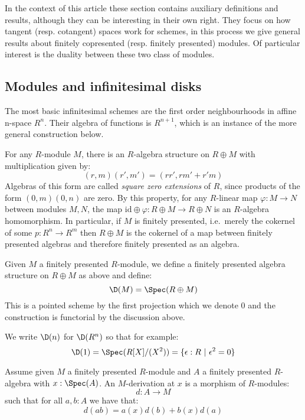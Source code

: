 In the context of this article these section contains auxiliary definitions and results, although they can be interesting in their own right. They focus on how tangent (resp. cotangent) spaces work for schemes, in this process we give general results about finitely copresented (resp. finitely presented) modules. Of particular interest is the duality between these two class of modules.

\subsection{Modules and infinitesimal disks}

The most basic infinitesimal schemes are the first order neighbourhoods in affine n-space $R^n$. Their algebra of functions is $R^{n+1}$, which is an instance of the more general construction below.

For any $R$-module $M$, there is an $R$-algebra structure on $R\oplus M$ with multiplication given by:
\[(r,m)(r',m') = (rr',rm'+r'm)\]
Algebras of this form are called \emph{square zero extensions} of $R$, since products of the form $(0,m)(0,n)$ are zero.
By this property, for any $R$-linear map $\varphi:M\to N$ between modules $M,N$, the map $\mathrm{id}\oplus \varphi: R\oplus M\to R\oplus N$ is an $R$-algebra homomorphism. In particular, if $M$ is finitely presented, i.e.\ merely the cokernel of some $p:R^n\to R^m$ then $R\oplus M$ is the cokernel of a map between finitely presented algebras and therefore finitely presented as an algebra. 

\begin{definition}
Given $M$ a finitely presented $R$-module, we define a finitely presented algebra structure on $R\oplus M$ as above and define:
\[\D(M) = \Spec(R\oplus M)\]
This is a pointed scheme by the first projection which we denote $0$
and the construction is functorial by the discussion above.
\end{definition}

We write $\D(n)$ for $\D(R^n)$ so that for example:
\[\D(1) = \Spec(R[X]/(X^2)) = \{\epsilon:R\ |\ \epsilon^2=0\}\]

\begin{definition}\label{derivation-pointwise}
Assume given $M$ a finitely presented $R$-module and $A$ a finitely presented $R$-algebra with $x:\Spec(A)$. An $M$-derivation at $x$ is a morphism of $R$-modules:
\[d:A\to M\]
such that for all $a,b:A$ we have that:
\[d(ab) = a(x)d(b) + b(x)d(a)\]
\end{definition}

